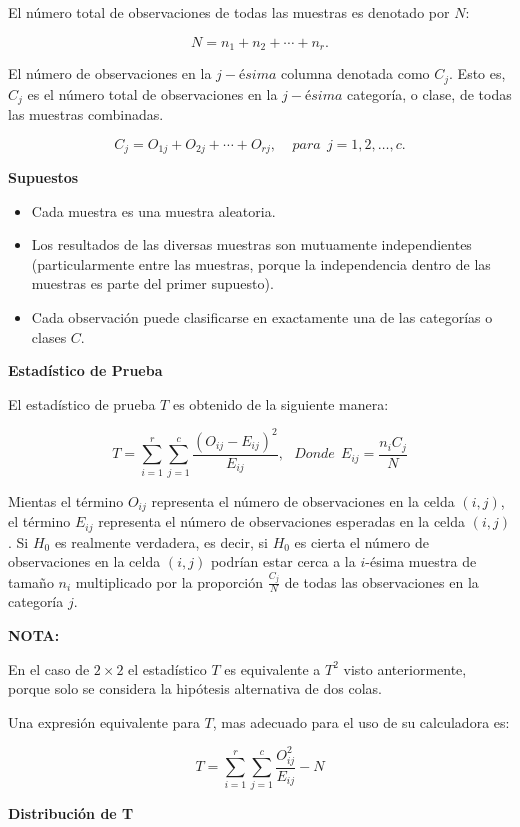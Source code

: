\documentclass[
  a4paper,
  oneside,
  openany]{book}
\begin{document}
El número total de observaciones de todas las muestras es denotado por \(N\):

\[N=n_{1}+n_{2}+\cdots+n_{r}.\]

El número de observaciones en la \(j-ésima\) columna denotada como \(C_{j}\). Esto es, \(C_{j}\) es el número total de observaciones en la \(j-ésima\) categoría, o clase, de todas las muestras combinadas.

\[C_{j}=O_{1j}+O_{2j}+\cdots+O_{rj}, \ \ \ \ \ para\ \ j= 1,2,\ldots,c. \]

\textbf{Supuestos}

\begin{itemize}
\item
  Cada muestra es una muestra aleatoria.
\item
  Los resultados de las diversas muestras son mutuamente independientes (particularmente entre las muestras, porque la independencia dentro de las muestras es parte del primer supuesto).
\item
  Cada observación puede clasificarse en exactamente una de las categorías o clases \(C\).
\end{itemize}

\textbf{Estadístico de Prueba}

El estadístico de prueba \(T\) es obtenido de la siguiente manera:

\[T=\sum_{i=1}^{r}\sum_{j=1}^{c}\frac{(O_{ij}-E_{ij})^2}{E_{ij}}, \ \ \ Donde\ \ E_{ij}=\frac{n_{i}C_{j}}{N}\]

Mientas el término \(O_{ij}\) representa el número de observaciones en la celda \((i,j)\), el término \(E_{ij}\) representa el número de observaciones esperadas en la celda \((i,j)\). Si \(H_0\) es realmente verdadera, es decir, si \(H_0\) es cierta el número de observaciones en la celda \((i,j)\) podrían estar cerca a la \(i\)-ésima muestra de tamaño \(n_{i}\) multiplicado por la proporción \(\frac{C_{j}}{N}\) de todas las observaciones en la categoría \(j\).

\textbf{NOTA:}

En el caso de \(2 \times 2\) el estadístico \(T\) es equivalente a \(T^2\) visto anteriormente, porque solo se considera la hipótesis alternativa de dos colas.

Una expresión equivalente para \(T\), mas adecuado para el uso de su calculadora es:

\[T=\sum_{i=1}^{r}\sum_{j=1}^{c}\frac{O_{ij}^{2}}{E_{ij}}-N\]

\textbf{Distribución de T}
\end{document}
